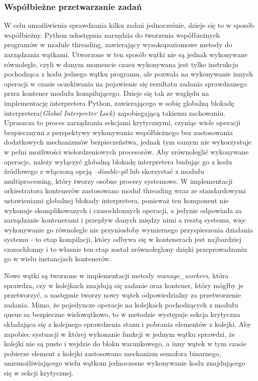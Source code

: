 \subsubsection{Współbieżne przetwarzanie zadań}
W celu umożliwienia sprawdzania kilku zadań jednocześnie, dzieje się to w sposób współbieżny. Python udostępnia narzędzia do tworzenia współbieżnych programów w module threading\cite{pythonThreading}, zawierający wysokopoziomowe metody do zarządzania wątkami. Utworzone w ten sposób wątki nie są jednak wykonywane równolegle, czyli w danym momencie czasu wykonywana jest tylko instrukcja pochodząca z kodu jednego wątku programu, ale pozwala na wykonywanie innych operacji w czasie oczekiwania na pojawienie się rezultatu zadania sprawdzanego przez kontener modułu kompilującego. Dzieje się tak ze względu na implementację interpretera Python, zawierającego w sobię globalną blokadę interpretera(\textit{Global Interpreter Lock}\cite{pythonGlobalInterpreterLock}) zapobiegającą takiemu zachowaniu. Upraszcza to proces zarządzania sekcjami krytycznymi, czyniąc wiele operacji bezpiecznymi z perspektywy wykonywania współbieżnego bez zastosowania dodatkowych mechanizmów bezpieczeństwa, jednak tym samym nie wykorzystuje w pełni możliwości wielordzeniowych procesorów. Aby zrównoleglić wykonywane operacje, należy wyłączyć globalną blokadę interpretera budując go z kodu źródłowego z włączoną opcją \textit{--disable-gil} lub skorzystać z modułu multiprocessing\cite{pythonMultiprocessing}, który tworzy osobne procesy systemowe. W implementacji orkiestratora kontenerów zastosowano moduł threading wraz ze standardowymi ustawieniami globalnej blokady interpretera, ponieważ ten komponent nie wykonuje skomplikowanych i czasochłonnych operacji, a jedynie odpowiada za zarządzanie kontenerami i przepływ danych między nimi a resztą systemu, więc wykonywanie go równolegle nie przyniosłoby wymiernego przyspieszenia działania systemu - to etap kompilacji, który odbywa się w kontenerach jest najbardziej czasochłonny i to własnie ten etap został zrównoleglony dzięki przeprowadzaniu go w wielu instancjach kontenerów.

Nowe wątki są tworzone w implementacji metody \textit{manage\_workers}, która sprawdza, czy w kolejkach znajdują się zadanie oraz kontener, który mógłby je przetworzyć, a następnie tworzy nowy wątek odpowiedzialny za przetworzenie zadania. Mimo, że pojedyncze operacje na kolejkach pochodzących z modułu queue\cite{pythonQueue} sa bezpieczne wielowątkowo, to w metodzie występuje sekcja krytyczna składająca się z kolejnego sprawdzenia stanu i pobrania elementów z kolejki. Aby zapobiec systuacji w której wykonanie funkcji w jednym wątku sprawdzi, że kolejki nie są puste i wejdzie do bloku warunkowego, a inny wątek w tym czasie pobierze element z kolejki zastosowano mechanizm semafora binarnego, uniemożliwiającego wielu wątkom jednoczesne wykonywanie kodu znajdującego się w sekcji krytycznej. 

